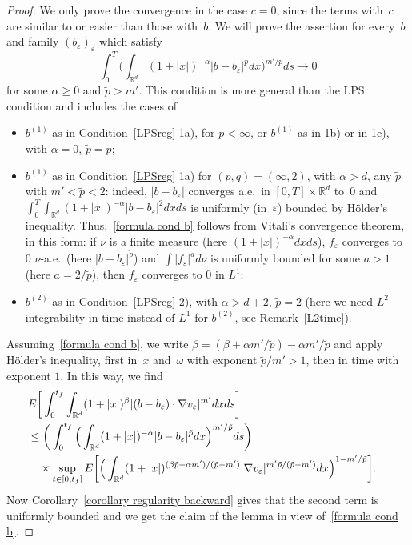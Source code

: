 \documentclass[a4paper,10pt]{article}
\newcommand\1{\mathbbm{1}}
\newcommand{\td}{\tilde}
\newcommand{\eps}{\varepsilon}
\numberwithin{equation}{section}
\begin{document}
\begin{proof}
We only prove the convergence in the case $c=0$, since the terms with~$c$ are similar to or easier than those with~$b$. We will prove the assertion for every~$b$ and family $(b_\eps)_\eps$ which satisfy
\begin{equation}
\int^T_0 \Big( \int_{\mathbb{R}^d}(1+|x|)^{-\alpha}|b-b_\eps|^{\td{p}}dx \Big)^{m'/\td{p}}ds\rightarrow0\label{formula cond b}
\end{equation}
for some $\alpha\ge0$ and $\td{p}>m'$. This condition is more general than the LPS condition and includes the cases of
\begin{itemize}
 \item $b^{(1)}$ as in Condition~\ref{LPSreg} 1a), for $p<\infty$, or $b^{(1)}$ as in 1b) or in 1c), with $\alpha=0$, $\td{p}=p$;
 \item $b^{(1)}$ as in Condition~\ref{LPSreg} 1a) for $(p,q)=(\infty,2)$, with $\alpha>d$, any $\td{p}$ with $m'<\td{p}<2$: indeed, $|b-b_\eps|$ converges a.e.~in $[0,T] \times \mathbb{R}^d$ to~$0$ and $\int^T_0\int_{\mathbb{R}^d}(1+|x|)^{-\alpha}|b-b_\eps|^2dxds$ is uniformly (in~$\eps$) bounded by H\"older's inequality. Thus,~\eqref{formula cond b} follows from Vitali's convergence theorem, in this form: if $\nu$ is a finite measure (here $(1+|x|)^{-\alpha}dxds$), $f_\eps$ converges to $0$ $\nu$-a.e.~(here $|b-b_\eps|^{\td{p}}$) and $\int|f_\eps|^ad\nu$ is uniformly bounded for some $a>1$ (here $a=2/\td{p}$), then $f_\eps$ converges to $0$ in $L^1$;
 \item $b^{(2)}$ as in Condition~\ref{LPSreg} 2), with $\alpha>d+2$, $\td{p}=2$ (here we need $L^2$ integrability in time instead of $L^1$ for $b^{(2)}$, see Remark~\ref{L2time}).
\end{itemize}

Assuming~\eqref{formula cond b}, we write $\beta=(\beta+\alpha m'/\td{p})-\alpha m'/\td{p}$ and apply H\"older's inequality, first in~$x$ and~$\omega$ with exponent $\td{p}/m'>1$, then in time with exponent $1$. In this way, we find
\begin{align*}
\lefteqn{E \bigg[ \int^{t_f}_0\int_{\mathbb{R}^d}(1+|x|)^\beta|(b-b_\eps)\cdot\nabla v_\eps|^{m'}dxds \bigg] } \\
& \le \bigg(\int^{t_f}_0\Big(\int_{\mathbb{R}^d}(1+|x|)^{-\alpha}|b-b_\eps|^{\td{p}}dx\Big)^{m'/\td{p}}ds \bigg)\\
& \quad {}\times \sup_{t\in[0,t_f]} E\bigg[ \Big(\int_{\mathbb{R}^d}(1+|x|)^{(\beta\td{p}+\alpha m')/(\td{p}-m')} |\nabla v_\eps|^{m'\td{p}/(\td{p}-m')} dx \Big)^{1-m'/\td{p}} \bigg] .
\end{align*}
Now Corollary~\ref{corollary regularity backward} gives that the second term is uniformly bounded and we get the claim of the lemma in view of~\eqref{formula cond b}.
\end{proof}
\end{document}
